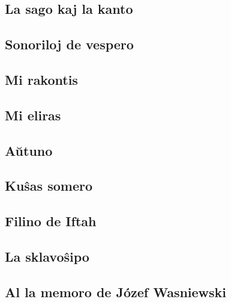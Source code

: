 \documentclass[a5paper,11pt,openany,twoside]{book}
\begin{document}
\subsection{La sago kaj la kanto}
\label{sago}

\subsection{Sonoriloj de vespero}
\label{sonoriloj}


\subsection{Mi rakontis}
\label{rakontis}

\vspace*{-5ex} %

\subsection{Mi eliras}
\label{eliras}


\subsection{A\u utuno}
\label{auxtuno}


\subsection{Ku\^sas somero}
\label{somero}


\subsection{Filino de Iftah}
\label{filino}

\subsection{La sklavo\^sipo}
\label{sklavo}


\subsection{Al la memoro de J\'ozef Wasniewski}
\label{memoro}

\end{document}
